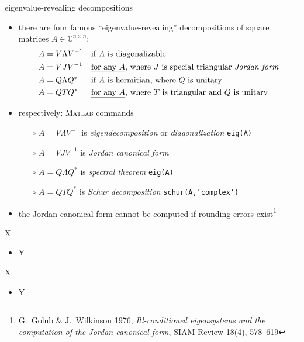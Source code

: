 \documentclass[10pt,hyperref]{beamer}
\newcommand{\CC}{\mathbb{C}}
\newcommand{\Matlab}{\textsc{Matlab}\xspace}
\begin{document}
\begin{frame}{eigenvalue-revealing decompositions}

\begin{itemize}  
\item there are four famous ``eigenvalue-revealing'' decompositions of square matrices $A\in\CC^{n\times n}$:
\begin{align*}
A &= V \Lambda V^{-1} & &\text{if $A$ is diagonalizable} \\
A &= V J V^{-1} & &\text{\underline{for any $A$}, where $J$ is special triangular \emph{Jordan form}} \\
A &= Q \Lambda Q^* & &\text{if $A$ is hermitian, where $Q$ is unitary} \\
A &= Q T Q^* & &\text{\underline{for any $A$}, where $T$ is triangular and $Q$ is unitary}
\end{align*}
\item respectively: \hfill \small \Matlab commands\normalsize
    \begin{itemize}
    \item[$\circ$] $A = V \Lambda V^{-1}$ is \emph{eigendecomposition} or \emph{diagonalization} \hfill \texttt{eig(A)}
    \item[$\circ$] $A = V J V^{-1}$ is \emph{Jordan canonical form}
    \item[$\circ$] $A = Q \Lambda Q^*$ is \emph{spectral theorem} \hfill \texttt{eig(A)}
    \item[$\circ$] $A = Q T Q^*$ is \emph{Schur decomposition} \hfill \texttt{schur(A,'complex')}
    \end{itemize}
\item the Jordan canonical form cannot be computed if rounding errors exist\footnote{G.~Golub \& J.~Wilkinson 1976, \emph{Ill-conditioned eigensystems and the computation of the Jordan canonical form}, SIAM Review 18(4), 578--619}
\end{itemize}
\end{frame}


\begin{frame}{X}

\begin{itemize}
\item Y
\end{itemize}
\end{frame}


\begin{frame}{X}

\begin{itemize}
\item Y
\end{itemize}
\end{frame}
\end{document}
